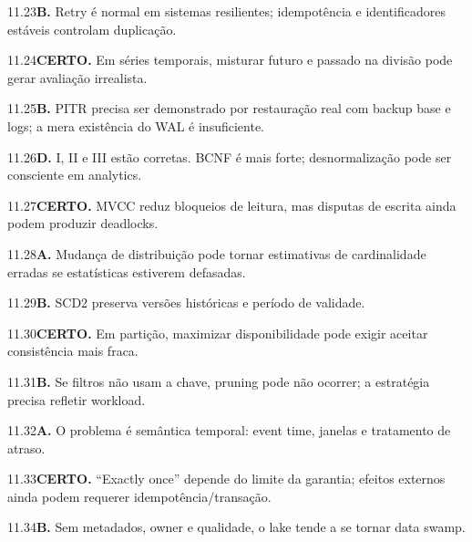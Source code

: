\begin{solucao}{11.23}\textbf{B.} Retry é normal em sistemas resilientes; idempotência e identificadores estáveis controlam duplicação.\end{solucao}
\begin{solucao}{11.24}\textbf{CERTO.} Em séries temporais, misturar futuro e passado na divisão pode gerar avaliação irrealista.\end{solucao}
\begin{solucao}{11.25}\textbf{B.} PITR precisa ser demonstrado por restauração real com backup base e logs; a mera existência do WAL é insuficiente.\end{solucao}

\begin{solucao}{11.26}\textbf{D.} I, II e III estão corretas. BCNF é mais forte; desnormalização pode ser consciente em analytics.\end{solucao}
\begin{solucao}{11.27}\textbf{CERTO.} MVCC reduz bloqueios de leitura, mas disputas de escrita ainda podem produzir deadlocks.\end{solucao}
\begin{solucao}{11.28}\textbf{A.} Mudança de distribuição pode tornar estimativas de cardinalidade erradas se estatísticas estiverem defasadas.\end{solucao}
\begin{solucao}{11.29}\textbf{B.} SCD2 preserva versões históricas e período de validade.\end{solucao}
\begin{solucao}{11.30}\textbf{CERTO.} Em partição, maximizar disponibilidade pode exigir aceitar consistência mais fraca.\end{solucao}
\begin{solucao}{11.31}\textbf{B.} Se filtros não usam a chave, pruning pode não ocorrer; a estratégia precisa refletir workload.\end{solucao}
\begin{solucao}{11.32}\textbf{A.} O problema é semântica temporal: event time, janelas e tratamento de atraso.\end{solucao}
\begin{solucao}{11.33}\textbf{CERTO.} ``Exactly once'' depende do limite da garantia; efeitos externos ainda podem requerer idempotência/transação.\end{solucao}
\begin{solucao}{11.34}\textbf{B.} Sem metadados, owner e qualidade, o lake tende a se tornar data swamp.\end{solucao}
